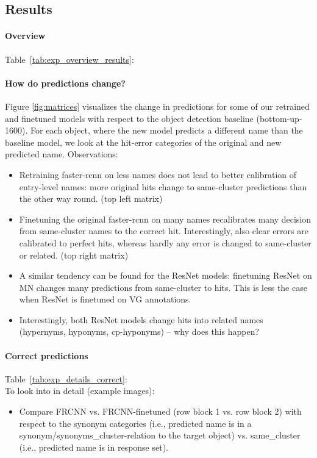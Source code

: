 \subsection{Results}
\paragraph{Overview}
Table\ \ref{tab:exp_overview_results}: 

\paragraph{How do predictions change?} Figure \ref{fig:matrices} visualizes the change in predictions for  some of our retrained and finetuned models with respect to the object detection baseline (bottom-up-1600). For each object, where the new model predicts a different name than the baseline model, we look at the hit-error categories of the original and new predicted name. Observations:
\begin{itemize}
\item Retraining faster-rcnn on less names does not lead to better calibration of entry-level names: more original hits change to same-cluster predictions than the other way round. (top left matrix)
\item Finetuning the original faster-rcnn on many names recalibrates many decision from same-cluster names to the correct hit. Interestingly, also clear errors are calibrated to perfect hits, whereas hardly any error is changed to same-cluster or related.  (top right matrix)
\item A similar tendency can be found for the ResNet models: finetuning ResNet on MN changes many predictions from same-cluster to hits. This is less the case when ResNet is finetuned on VG annotations.
\item Interestingly, both ResNet models change hits into related names (hypernyms, hyponyms, cp-hyponyms) -- why does this happen?
\end{itemize}


\paragraph{Correct predictions}
Table\ \ref{tab:exp_details_correct}: \\
To look into in detail (example images): 
\begin{itemize}
	\item Compare FRCNN vs. FRCNN-finetuned (row block 1 vs. row block 2) with respect to the synonym categories (i.e., predicted name is in a synonym/synonyms\_cluster-relation to the target object) vs. same\_cluster (i.e., predicted name is in response set). 
\end{itemize}


